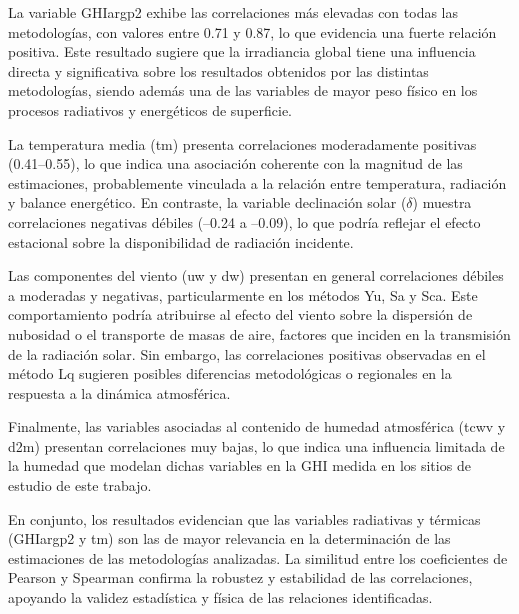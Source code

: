 La variable GHIargp2 exhibe las correlaciones más elevadas con todas las metodologías, con valores entre 0.71 y 0.87, lo que evidencia una fuerte relación positiva. Este resultado sugiere que la irradiancia global tiene una influencia directa y significativa sobre los resultados obtenidos por las distintas metodologías, siendo además una de las variables de mayor peso físico en los procesos radiativos y energéticos de superficie.

La temperatura media (tm) presenta correlaciones moderadamente positivas (0.41–0.55), lo que indica una asociación coherente con la magnitud de las estimaciones, probablemente vinculada a la relación entre temperatura, radiación y balance energético. En contraste, la variable declinación solar ($\delta$) muestra correlaciones negativas débiles (–0.24 a –0.09), lo que podría reflejar el efecto estacional sobre la disponibilidad de radiación incidente.

Las componentes del viento (uw y dw) presentan en general correlaciones débiles a moderadas y negativas, particularmente en los métodos Yu, Sa y Sca. Este comportamiento podría atribuirse al efecto del viento sobre la dispersión de nubosidad o el transporte de masas de aire, factores que inciden en la transmisión de la radiación solar. Sin embargo, las correlaciones positivas observadas en el método Lq sugieren posibles diferencias metodológicas o regionales en la respuesta a la dinámica atmosférica.

Finalmente, las variables asociadas al contenido de humedad atmosférica (tcwv y d2m) presentan correlaciones muy bajas, lo que indica una influencia limitada de la humedad que modelan dichas variables en la GHI medida en los sitios de estudio de este trabajo.

En conjunto, los resultados evidencian que las variables radiativas y térmicas (GHIargp2 y tm) son las de mayor relevancia en la determinación de las estimaciones de las metodologías analizadas. La similitud entre los coeficientes de Pearson y Spearman confirma la robustez y estabilidad de las correlaciones, apoyando la validez estadística y física de las relaciones identificadas.






